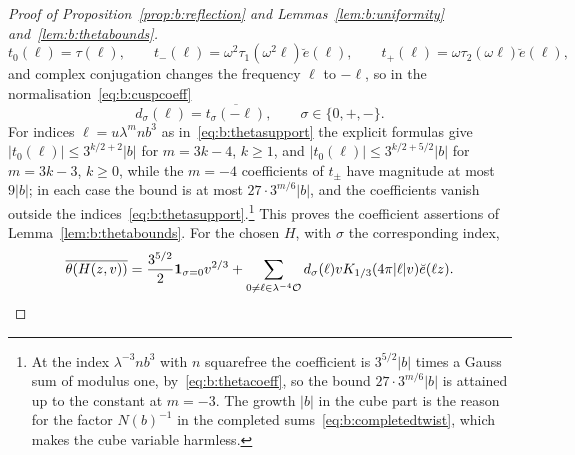 \begin{proof}[Proof of Proposition~\ref{prop:b:reflection} and Lemmas~\ref{lem:b:uniformity} and~\ref{lem:b:thetabounds}]
\begin{equation}\label{eq:b:cuspfourier}
  t_0(\ell)=\tau(\ell),\qquad t_-(\ell)=\omega^2\tau_1(\omega^2\ell)\breve e(\ell),\qquad t_+(\ell)=\omega\tau_2(\omega\ell)\breve e(\ell),
\end{equation}
and complex conjugation changes the frequency $\ell$ to $-\ell$, so in the normalisation~\eqref{eq:b:cuspcoeff}
\begin{equation}\label{eq:b:conjcusp}
  d_\sigma(\ell)=\overline{t_\sigma(-\ell)},\qquad\sigma\in\{0,+,-\}.
\end{equation}
For indices $\ell=u\lambda^mnb^3$ as in~\eqref{eq:b:thetasupport} the explicit formulas give $|t_0(\ell)|\le3^{k/2+2}|b|$ for $m=3k-4$, $k\ge1$, and $|t_0(\ell)|\le3^{k/2+5/2}|b|$ for $m=3k-3$, $k\ge0$, while the $m=-4$ coefficients of $t_\pm$ have magnitude at most $9|b|$; in each case the bound is at most $27\cdot3^{m/6}|b|$, and the coefficients vanish outside the indices~\eqref{eq:b:thetasupport}.\footnote{At the index $\lambda^{-3}nb^3$ with $n$ squarefree the coefficient is $3^{5/2}|b|$ times a Gauss sum of modulus one, by~\eqref{eq:b:thetacoeff}, so the bound $27\cdot3^{m/6}|b|$ is attained up to the constant at $m=-3$. The growth $|b|$ in the cube part is the reason for the factor $N(b)^{-1}$ in the completed sums~\eqref{eq:b:completedtwist}, which makes the cube variable harmless.} This proves the coefficient assertions of Lemma~\ref{lem:b:thetabounds}. For the chosen $H$, with $\sigma$ the corresponding index,
\[
  \overline{\theta(H(z,v))}=\frac{3^{5/2}}2\mathbf{1}_{\sigma=0}v^{2/3}+\sum_{0\ne\ell\in\lambda^{-4}\mathcal{O}}d_\sigma(\ell)vK_{1/3}(4\pi|\ell|v)\breve e(\ell z).
\]


\end{proof}
